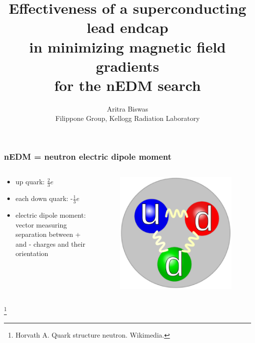 \documentclass{beamer}
\newcommand{\bottomcite}{\let\thefootnote\relax\footnote}
\begin{document}

\title{Effectiveness of a superconducting lead endcap\\ in minimizing magnetic field gradients\\ for the nEDM search}
\author{Aritra Biswas\\Filippone Group, Kellogg Radiation Laboratory}
\maketitle

\begin{frame}
\frametitle{nEDM = neutron electric dipole moment}

    \begin{columns}

    \begin{column}{0.5\textwidth}
    \begin{itemize}
        \item up quark: $\frac{2}{3} e$
        \item each down quark: -$\frac{1}{3} e$
        \item electric dipole moment: vector measuring separation between + and - charges
              and their orientation
    \end{itemize}
    \end{column}
    
    \begin{column}{0.5\textwidth}
    \begin{figure}
    \includegraphics[width=\textwidth]{figures/neutron_quarks.eps}
    \end{figure}
    \end{column}

    \end{columns}

    \bottomcite{Horvath A. Quark structure neutron. Wikimedia.}

\end{frame}
\end{document}
